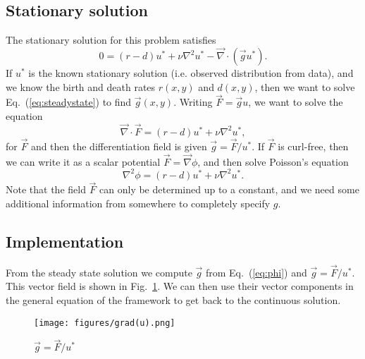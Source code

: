 \documentclass[11pt,oneside]{article}   	%
\newcommand{\grad}{\vec{\nabla}}
\renewcommand{\figurename}{Fig.}
\renewcommand{\eqref}[1]{Eq.~(\ref{#1})}
\newcommand{\figref}[1]{\figurename~\ref{#1}}
\begin{document}
\subsection{Stationary solution}
The stationary solution for this problem satisfies
\begin{equation}
0 = (r-d)u^* + \nu \nabla^2 u^* - \grad \cdot (\vec{g} u^*).
\label{eq:steadystate}
\end{equation}
If $u^*$ is the known stationary solution (i.e. observed distribution from data), and we know the birth and death rates $r(x,y)$ and $d(x,y)$, then we want to solve \eqref{eq:steadystate} to find $\vec{g}(x,y)$.
Writing $\vec{F} = \vec{g}u$, we want to solve the equation
\begin{equation}
\grad \cdot \vec{F} = (r-d)u^* + \nu \nabla^2 u^*,
\end{equation}
for $\vec{F}$ and then the differentiation field is given $\vec{g} = \vec{F}/u^*$.
If $\vec{F}$ is curl-free, then we can write it as a scalar potential $\vec{F} = \grad \phi$, and then solve Poisson's equation
\begin{equation}
\nabla^2 \phi = (r-d)u^* + \nu \nabla^2 u^*.
\label{eq:phi}
\end{equation}
Note that the field $\vec{F}$ can only be determined up to a constant, and we need some additional information from somewhere to completely specify $g$.

\subsection{Implementation}
From the steady state solution we compute $\vec{g}$ from \eqref{eq:phi} and $\vec{g} = \vec{F}/u^*$.
This vector field is shown in \figref{fig:g}.
We can then use their vector components in the general equation of the framework to get back to the continuous solution.

\begin{figure}[h!]
\centering
\texttt{[image: figures/grad(u).png]}
\caption{$\vec{g} = \vec{F}/u^*$}
\label{fig:g}
\end{figure}
\end{document}

